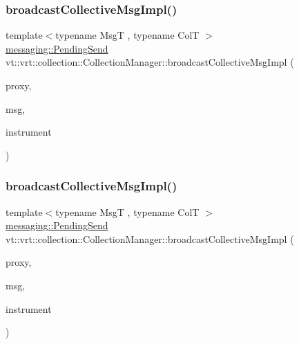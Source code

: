 \subsubsection{\texorpdfstring{broadcast\+Collective\+Msg\+Impl()}{broadcastCollectiveMsgImpl()}\hspace{0.1cm}{\footnotesize\ttfamily [1/2]}}
{\footnotesize\ttfamily template$<$typename MsgT , typename ColT $>$ \\
\hyperlink{structvt_1_1messaging_1_1_pending_send}{messaging\+::\+Pending\+Send} vt\+::vrt\+::collection\+::\+Collection\+Manager\+::broadcast\+Collective\+Msg\+Impl (\begin{DoxyParamCaption}\item[{\hyperlink{structvt_1_1vrt_1_1collection_1_1_collection_manager_a56458ed7f9bb22b631b9b3a745f42f94}{Collection\+Proxy\+Wrap\+Type}$<$ ColT $>$ const \&}]{proxy,  }\item[{\hyperlink{namespacevt_a9f5ebd62ee9d6dd8829e3e1cc4f858e9}{Msg\+Ptr}$<$ MsgT $>$ \&}]{msg,  }\item[{\mbox{[}\mbox{[}maybe\+\_\+unused\mbox{]} \mbox{]} bool}]{instrument }\end{DoxyParamCaption})}

\mbox{\label{structvt_1_1vrt_1_1collection_1_1_collection_manager_aae2f8d1ebc378183074c3572894c7ffc}} 
\subsubsection{\texorpdfstring{broadcast\+Collective\+Msg\+Impl()}{broadcastCollectiveMsgImpl()}\hspace{0.1cm}{\footnotesize\ttfamily [2/2]}}
{\footnotesize\ttfamily template$<$typename MsgT , typename ColT $>$ \\
\hyperlink{structvt_1_1messaging_1_1_pending_send}{messaging\+::\+Pending\+Send} vt\+::vrt\+::collection\+::\+Collection\+Manager\+::broadcast\+Collective\+Msg\+Impl (\begin{DoxyParamCaption}\item[{\hyperlink{structvt_1_1vrt_1_1collection_1_1_collection_manager_a56458ed7f9bb22b631b9b3a745f42f94}{Collection\+Proxy\+Wrap\+Type}$<$ ColT $>$ const \&}]{proxy,  }\item[{\hyperlink{namespacevt_a9f5ebd62ee9d6dd8829e3e1cc4f858e9}{Msg\+Ptr}$<$ MsgT $>$ \&}]{msg,  }\item[{bool}]{instrument }\end{DoxyParamCaption})}



